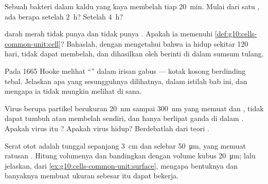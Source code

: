 \begin{exercise}[$\star\star$]\label{exo:g10:cells-common-unit:11}
Sebuah bakteri dalam kaldu yang kaya membelah tiap \qty{20}{min}. Mulai
dari satu , ada berapa  setelah \qty{2}{h}? Setelah \qty{4}{h}?
\end{exercise}

\begin{exercise}[$\star\star\star$]\label{exo:g10:cells-common-unit:12}
 darah merah tidak punya  dan tidak punya .
Apakah ia memenuhi \cref{def:g10:cells-common-unit:cell}? Bahaslah,
dengan mengetahui bahwa ia hidup sekitar 120 hari, tidak dapat
membelah, dan dihasilkan oleh  berinti di dalam sumsum tulang.
\end{exercise}

\begin{exercise}[$\star\star\star$]\label{exo:g10:cells-common-unit:13}
Pada 1665 Hooke melihat ``'' dalam irisan gabus --- kotak kosong
berdinding tebal. Jelaskan apa yang sesungguhnya dilihatnya, dalam
istilah bab ini, dan mengapa ia tidak mungkin melihat  di sana.
\end{exercise}

\begin{exercise}[$\star\star\star$]\label{exo:g10:cells-common-unit:14}
Virus berupa partikel berukuran \qty{20}{nm} sampai \qty{300}{nm} yang
memuat  dan , tidak dapat tumbuh atau membelah
sendiri, dan hanya berlipat ganda di dalam . Apakah virus itu ?
Apakah virus hidup? Berdebatlah dari teori .
\end{exercise}

\begin{exercise}[$\star\star\star$]\label{exo:g10:cells-common-unit:15}
Serat otot adalah  tunggal sepanjang \qty{3}{cm} dan selebar
\qty{50}{\micro m}, yang memuat ratusan . Hitung volumenya dan
bandingkan dengan volume  kubus \qty{20}{\micro m}; lalu jelaskan,
dari \cref{ex:g10:cells-common-unit:surface}, mengapa bentuknya dan
banyaknya  membuat ukuran sebesar itu dapat bekerja.
\end{exercise}

